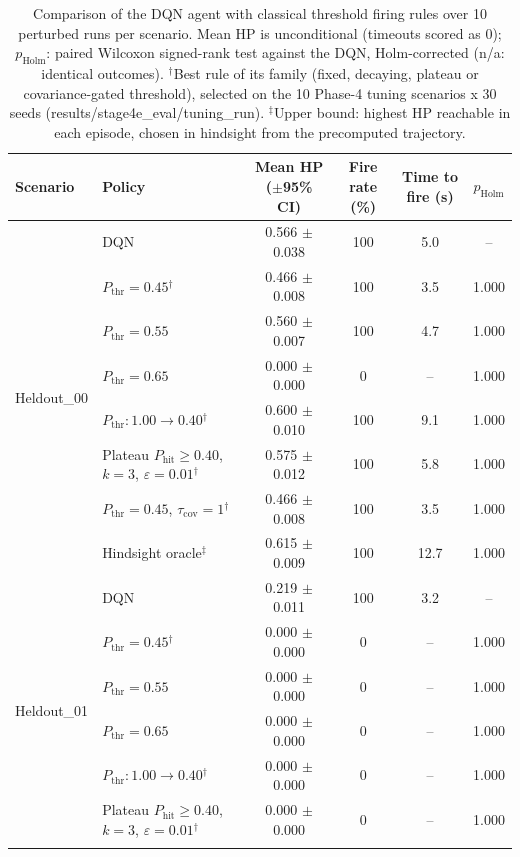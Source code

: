 \begin{table}[htbp]
\centering
\caption{Comparison of the DQN agent with classical threshold firing rules over 10 perturbed runs per scenario. Mean HP is unconditional (timeouts scored as 0); $p_{\mathrm{Holm}}$: paired Wilcoxon signed-rank test against the DQN, Holm-corrected (n/a: identical outcomes). $^{\dagger}$Best rule of its family (fixed, decaying, plateau or covariance-gated threshold), selected on the 10 Phase-4 tuning scenarios x 30 seeds (results/stage4e_eval/tuning_run). $^{\ddagger}$Upper bound: highest HP reachable in each episode, chosen in hindsight from the precomputed trajectory.}
\label{tab:comparison-traditional-rl}
\small
\begin{tabular}{llcccc}
\toprule
\textbf{Scenario} & \textbf{Policy} & \textbf{Mean HP ($\pm$95\% CI)} & \textbf{Fire rate (\%)} & \textbf{Time to fire (s)} & $p_{\mathrm{Holm}}$ \\
\midrule
\multirow{8}{*}{Heldout\_00} & DQN & 0.566 $\pm$ 0.038 & 100 & 5.0 & -- \\
 & $P_{\mathrm{thr}}=0.45$$^{\dagger}$ & 0.466 $\pm$ 0.008 & 100 & 3.5 & 1.000 \\
 & $P_{\mathrm{thr}}=0.55$ & 0.560 $\pm$ 0.007 & 100 & 4.7 & 1.000 \\
 & $P_{\mathrm{thr}}=0.65$ & 0.000 $\pm$ 0.000 & 0 & -- & 1.000 \\
 & $P_{\mathrm{thr}}: 1.00 \to 0.40$$^{\dagger}$ & 0.600 $\pm$ 0.010 & 100 & 9.1 & 1.000 \\
 & Plateau $P_{\mathrm{hit}}\geq0.40$, $k=3$, $\varepsilon=0.01$$^{\dagger}$ & 0.575 $\pm$ 0.012 & 100 & 5.8 & 1.000 \\
 & $P_{\mathrm{thr}}=0.45$, $\tau_{\mathrm{cov}}=1$$^{\dagger}$ & 0.466 $\pm$ 0.008 & 100 & 3.5 & 1.000 \\
 & Hindsight oracle$^{\ddagger}$ & 0.615 $\pm$ 0.009 & 100 & 12.7 & 1.000 \\
\midrule
\multirow{8}{*}{Heldout\_01} & DQN & 0.219 $\pm$ 0.011 & 100 & 3.2 & -- \\
 & $P_{\mathrm{thr}}=0.45$$^{\dagger}$ & 0.000 $\pm$ 0.000 & 0 & -- & 1.000 \\
 & $P_{\mathrm{thr}}=0.55$ & 0.000 $\pm$ 0.000 & 0 & -- & 1.000 \\
 & $P_{\mathrm{thr}}=0.65$ & 0.000 $\pm$ 0.000 & 0 & -- & 1.000 \\
 & $P_{\mathrm{thr}}: 1.00 \to 0.40$$^{\dagger}$ & 0.000 $\pm$ 0.000 & 0 & -- & 1.000 \\
 & Plateau $P_{\mathrm{hit}}\geq0.40$, $k=3$, $\varepsilon=0.01$$^{\dagger}$ & 0.000 $\pm$ 0.000 & 0 & -- & 1.000 \\
$$
\end{tabular}
\end{table}
